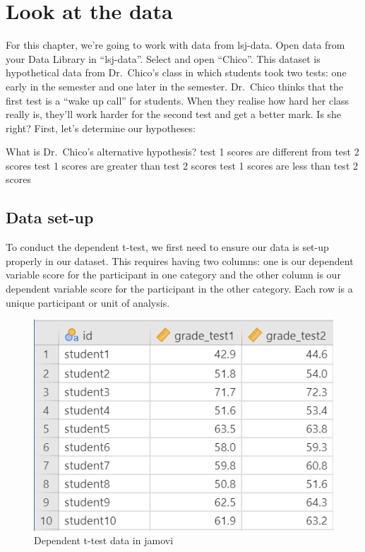 \documentclass[
]{book}
\begin{document}
\hypertarget{look-at-the-data-1}{%
\section{Look at the data}\label{look-at-the-data-1}}

For this chapter, we're going to work with data from lsj-data. Open data from your Data Library in ``lsj-data''. Select and open ``Chico''. This dataset is hypothetical data from Dr.~Chico's class in which students took two tests: one early in the semester and one later in the semester. Dr.~Chico thinks that the first test is a ``wake up call'' for students. When they realise how hard her class really is, they'll work harder for the second test and get a better mark. Is she right? First, let's determine our hypotheses:

What is Dr.~Chico's alternative hypothesis? test 1 scores are different from test 2 scores test 1 scores are greater than test 2 scores test 1 scores are less than test 2 scores

\hypertarget{data-set-up-1}{%
\subsection{Data set-up}\label{data-set-up-1}}

To conduct the dependent t-test, we first need to ensure our data is set-up properly in our dataset. This requires having two columns: one is our dependent variable score for the participant in one category and the other column is our dependent variable score for the participant in the other category. Each row is a unique participant or unit of analysis.

\begin{figure}

{\centering \includegraphics[width=0.8\linewidth]{images/03_dependent_t-test/dependent_data} 

}

\caption{Dependent t-test data in jamovi}\label{fig:unnamed-chunk-1}
\end{figure}
\end{document}
